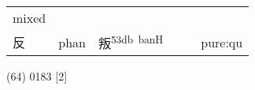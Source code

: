 \documentclass[14pt,a4paper]{scrartcl}
\begin{document}
\begin{longtable}[c]{@{}llllll@{}}
\begin{minipage}[t]{0.14\columnwidth}
mixed
\strut\end{minipage}\tabularnewline
\begin{minipage}[t]{0.14\columnwidth}\raggedright\strut
反
\strut\end{minipage} &
\begin{minipage}[t]{0.14\columnwidth}\raggedright\strut
phan
\strut\end{minipage} &
\begin{minipage}[t]{0.14\columnwidth}\raggedright\strut
叛\textsuperscript{53db~banH}
\strut\end{minipage} &
\begin{minipage}[t]{0.14\columnwidth}\raggedright\strut
\strut\end{minipage} &
\begin{minipage}[t]{0.14\columnwidth}\raggedright\strut
\strut\end{minipage} &
\begin{minipage}[t]{0.14\columnwidth}\raggedright\strut
pure:qu
\strut\end{minipage}\tabularnewline
\bottomrule
\end{longtable}

(64) 0183 {[}2{]}
\end{document}
